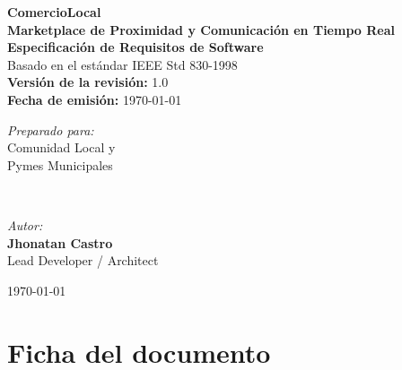 \documentclass[11pt,a4paper]{report}
\begin{document}
\begin{titlepage}
    \centering
    \vspace*{1.5cm}
    {\Huge\bfseries\color{NavyBlue} ComercioLocal}\\[0.6cm]
    {\Large\bfseries Marketplace de Proximidad y Comunicación en Tiempo Real}\\[1.5cm]
    
    {\Huge\bfseries Especificación de Requisitos de Software}\\[0.8cm]
    {\large Basado en el estándar IEEE Std 830-1998}\\[2cm]
    
    \textbf{Versión de la revisión:} 1.0\\
    \textbf{Fecha de emisión:} \today\\[3cm]
    
    \begin{minipage}{0.45\textwidth}
        \begin{flushleft} \large
            \emph{Preparado para:}\\
            Comunidad Local y\\
            Pymes Municipales
        \end{flushleft}
    \end{minipage}
    ~
    \begin{minipage}{0.45\textwidth}
        \begin{flushright} \large
            \emph{Autor:}\\
            \textbf{Jhonatan Castro}\\
            \small Lead Developer / Architect
        \end{flushright}
    \end{minipage}
    
    \vfill
    {\large \today}
\end{titlepage}

\chapter*{Ficha del documento}
\end{document}
